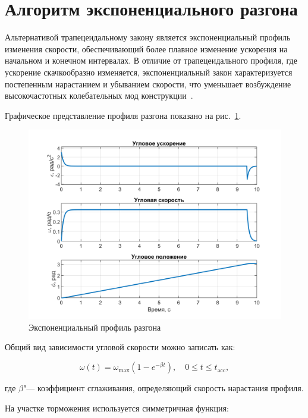 \section{Алгоритм экспоненциального разгона}
Альтернативой трапецеидальному закону является экспоненциальный профиль изменения скорости, обеспечивающий более плавное изменение ускорения на начальном и конечном интервалах. В отличие от трапецеидального профиля, где ускорение скачкообразно изменяется, экспоненциальный закон характеризуется постепенным нарастанием и убыванием скорости, что уменьшает возбуждение высокочастотных колебательных мод конструкции~\cite{Zeng2016,Chen2008}.

Графическое представление профиля разгона показано на рис.~\ref{fig:exp_profile}.

\begin{figure}[h!]
	\centering
	\includegraphics[scale=0.8]{matlab/img/exp-profile.png}
	\caption{Экспоненциальный профиль разгона}
	\label{fig:exp_profile}
\end{figure}



Общий вид зависимости угловой скорости можно записать как:

\begin{equation}
	\label{eq:exp_speed}
	\omega(t) = \omega_{\max}\left(1 - e^{-\beta t}\right), \quad 0 \leq t \leq t_{\mathrm{acc}},
\end{equation}

где \(\beta\)"--- коэффициент сглаживания, определяющий скорость нарастания профиля. 

На участке торможения используется симметричная функция:

